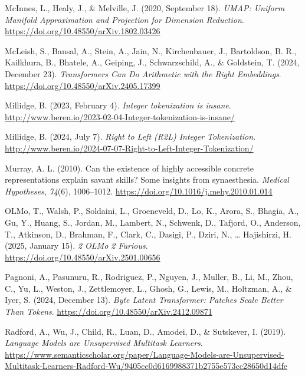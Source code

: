 \documentclass[
  a4paper, twoside, 10pt, titlepage]{book}
\newlength{\cslhangindent}
\newenvironment{CSLReferences}[2] %
 {\begin{list}{}{%
  \setlength{\itemindent}{0pt}
  \setlength{\leftmargin}{0pt}
  \setlength{\parsep}{0pt}
  \ifodd #1
   \setlength{\leftmargin}{\cslhangindent}
   \setlength{\itemindent}{-1\cslhangindent}
  \fi
  \setlength{\itemsep}{#2\baselineskip}}}
 {\end{list}}
\begin{document}
\begin{CSLReferences}{1}{0}
McInnes, L., Healy, J., \& Melville, J. (2020, September 18).
\emph{{UMAP}: {Uniform Manifold Approximation} and {Projection} for
{Dimension Reduction}}. \url{https://doi.org/10.48550/arXiv.1802.03426}

McLeish, S., Bansal, A., Stein, A., Jain, N., Kirchenbauer, J.,
Bartoldson, B. R., Kailkhura, B., Bhatele, A., Geiping, J.,
Schwarzschild, A., \& Goldstein, T. (2024, December 23).
\emph{Transformers {Can Do Arithmetic} with the {Right Embeddings}}.
\url{https://doi.org/10.48550/arXiv.2405.17399}

Millidge, B. (2023, February 4). \emph{Integer tokenization is insane}.
\url{http://www.beren.io/2023-02-04-Integer-tokenization-is-insane/}

Millidge, B. (2024, July 7). \emph{Right to {Left} ({R2L}) {Integer
Tokenization}}.
\url{http://www.beren.io/2024-07-07-Right-to-Left-Integer-Tokenization/}

Murray, A. L. (2010). Can the existence of highly accessible concrete
representations explain savant skills? {Some} insights from
synaesthesia. \emph{Medical Hypotheses}, \emph{74}(6), 1006--1012.
\url{https://doi.org/10.1016/j.mehy.2010.01.014}

OLMo, T., Walsh, P., Soldaini, L., Groeneveld, D., Lo, K., Arora, S.,
Bhagia, A., Gu, Y., Huang, S., Jordan, M., Lambert, N., Schwenk, D.,
Tafjord, O., Anderson, T., Atkinson, D., Brahman, F., Clark, C., Dasigi,
P., Dziri, N., \ldots{} Hajishirzi, H. (2025, January 15). \emph{2
{OLMo} 2 {Furious}}. \url{https://doi.org/10.48550/arXiv.2501.00656}

Pagnoni, A., Pasunuru, R., Rodriguez, P., Nguyen, J., Muller, B., Li,
M., Zhou, C., Yu, L., Weston, J., Zettlemoyer, L., Ghosh, G., Lewis, M.,
Holtzman, A., \& Iyer, S. (2024, December 13). \emph{Byte {Latent
Transformer}: {Patches Scale Better Than Tokens}}.
\url{https://doi.org/10.48550/arXiv.2412.09871}

Radford, A., Wu, J., Child, R., Luan, D., Amodei, D., \& Sutskever, I.
(2019). \emph{Language {Models} are {Unsupervised Multitask Learners}}.
\url{https://www.semanticscholar.org/paper/Language-Models-are-Unsupervised-Multitask-Learners-Radford-Wu/9405cc0d6169988371b2755e573cc28650d14dfe}


\end{CSLReferences}
\end{document}
